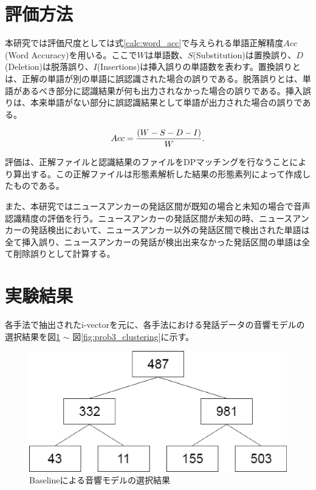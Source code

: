 \section{評価方法}
本研究では評価尺度としては式\ref{calc:word_acc}で与えられる単語正解精度$Acc$(Word Accuracy)を用いる。ここで$W$は単語数、$S$(Substitution)は置換誤り、$D$(Deletion)は脱落誤り、$I$(Insertions)は挿入誤りの単語数を表わす。置換誤りとは、正解の単語が別の単語に誤認識された場合の誤りである。脱落誤りとは、単語があるべき部分に認識結果が何も出力されなかった場合の誤りである。挿入誤りは、本来単語がない部分に誤認識結果として単語が出力された場合の誤りである。

\begin{equation}
\label{calc:word_acc}
Acc=\frac{(W-S-D-I)}{W}. \notag
\end{equation}

          
評価は、正解ファイルと認識結果のファイルをDPマッチングを行なうことにより算出する。この正解ファイルは形態素解析した結果の形態素列によって作成したものである。


また、本研究ではニュースアンカーの発話区間が既知の場合と未知の場合で音声認識精度の評価を行う。ニュースアンカーの発話区間が未知の時、ニュースアンカーの発話検出において、ニュースアンカー以外の発話区間で検出された単語は全て挿入誤り、ニュースアンカーの発話が検出出来なかった発話区間の単語は全て削除誤りとして計算する。

\section{実験結果}
各手法で抽出されたi-vectorを元に、各手法における発話データの音響モデルの選択結果を図\ref{fig:baseline_clustering} $\sim$ 図\ref{fig:prob3_clustering}に示す。

\begin{figure}[H]
  \begin{center}
    \includegraphics[scale=0.5]{./figure/baseline_clustering.eps}
  \end{center}
  \caption{Baselineによる音響モデルの選択結果 \label{fig:baseline_clustering}}
\end{figure}

